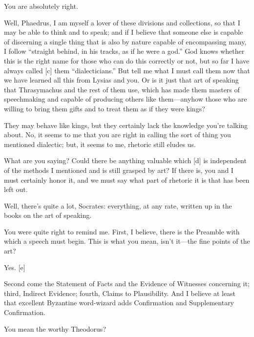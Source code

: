 \sayphaedrus You are absolutely right.

\saysocrates Well, Phaedrus, I am myself a lover of these divisions and
collections, so that I may be able to think and to speak; and if I
believe that someone else is capable of discerning a single thing that
is also by nature capable of encompassing
many, I follow
“straight behind, in his tracks, as if he were a
god.” God knows
whether this is the right name for those who can do this correctly or
not, but so far I have always called {[}c{]} them “dialecticians.” But
tell me what I must call them now that we have learned all this from
Lysias and you. Or is it just that art of speaking that Thrasymachus and
the rest of them use, which has made them masters of speechmaking and
capable of producing others like them---anyhow those who are willing to
bring them gifts and to treat them as if they were kings?

\sayphaedrus They may behave like kings, but they certainly lack the
knowledge you're talking about. No, it seems to me that you are right in
calling the sort of thing you mentioned dialectic; but, it seems to me,
rhetoric still eludes us.

\saysocrates What are you saying? Could there be anything valuable which
{[}d{]} is independent of the methods I mentioned and is still grasped
by art? If there is, you and I must certainly honor it, and we must say
what part of rhetoric it is that has been left out.

\sayphaedrus Well, there's quite a lot, Socrates: everything, at any rate,
written up in the books on the art of speaking.

\saysocrates You were quite right to remind me. First, I believe, there is
the Preamble with which a speech must begin. This is what you mean,
isn't it---the fine points of the art?

\sayphaedrus Yes. {[}e{]}

\saysocrates Second come the Statement of Facts and the Evidence of
Witnesses concerning it; third, Indirect Evidence; fourth, Claims to
Plausibility. And I believe at least that excellent Byzantine
word-wizard adds Confirmation and Supplementary Confirmation.

\sayphaedrus You mean the worthy
Theodorus?

